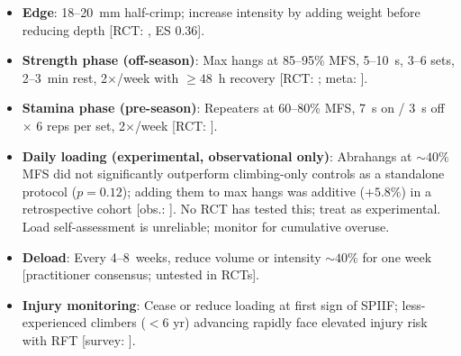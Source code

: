 \begin{itemize}[noitemsep, topsep=2pt]
  \item \textbf{Edge}: 18--20~mm half-crimp; increase intensity by adding weight before reducing depth \textnormal{[RCT: \cite{MSA+21}, ES 0.36]}.
  \item \textbf{Strength phase (off-season)}: Max hangs at 85--95\% MFS, 5--10~s, 3--6 sets, 2--3~min rest, 2$\times$/week with $\geq48$~h recovery \textnormal{[RCT: \cite{LRGB19, MSA+21}; meta: \cite{SO23}]}.
  \item \textbf{Stamina phase (pre-season)}: Repeaters at 60--80\% MFS, 7~s on / 3~s off $\times$ 6 reps per set, 2$\times$/week \textnormal{[RCT: \cite{HO22, DO22}]}.
  \item \textbf{Daily loading (experimental, observational only)}: Abrahangs at ${\sim}40\%$ MFS did not significantly outperform climbing-only controls as a standalone protocol ($p = 0.12$); adding them to max hangs was additive ($+5.8\%$) in a retrospective cohort \textnormal{[obs.: \cite{GKAO24}]}. No RCT has tested this; treat as experimental. Load self-assessment is unreliable; monitor for cumulative overuse.
  \item \textbf{Deload}: Every 4--8~weeks, reduce volume or intensity ${\sim}40\%$ for one week \textnormal{[practitioner consensus; untested in RCTs]}.
  \item \textbf{Injury monitoring}: Cease or reduce loading at first sign of SPIIF; less-experienced climbers ($<6$ yr) advancing rapidly face elevated injury risk with RFT \textnormal{[survey: \cite{SGJ23}]}.
\end{itemize}
